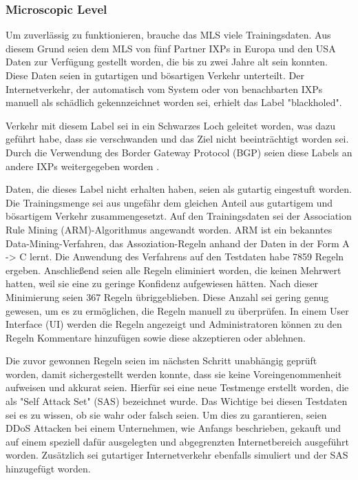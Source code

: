 \documentclass[sigplan,screen]{acmart}
\begin{document}
\subsubsection{Microscopic Level}
Um zuverlässig zu funktionieren, brauche das MLS viele Trainingsdaten. Aus diesem Grund seien dem MLS von fünf Partner IXPs in Europa und den USA Daten zur Verfügung gestellt worden, die bis zu zwei Jahre alt sein konnten. 
Diese Daten seien in gutartigen und bösartigen Verkehr unterteilt. Der Internetverkehr, der automatisch vom System oder von benachbarten IXPs manuell als schädlich gekennzeichnet worden sei, erhielt das Label "blackholed". 

Verkehr mit diesem Label sei in ein Schwarzes Loch geleitet worden, was dazu geführt habe, dass sie verschwanden und das Ziel nicht beeinträchtigt worden sei. 
Durch die Verwendung des Border Gateway Protocol (BGP) seien diese Labels an andere IXPs weitergegeben worden \cite{blackhole01}.

Daten, die dieses Label nicht erhalten haben, seien als gutartig eingestuft worden. Die Trainingsmenge sei aus ungefähr dem gleichen Anteil aus gutartigem und bösartigem Verkehr zusammengesetzt.
Auf den Trainingsdaten sei der Association Rule Mining (ARM)-Algorithmus angewandt worden. ARM ist ein bekanntes Data-Mining-Verfahren, das Assoziation-Regeln anhand der Daten in der Form A -> C lernt. Die Anwendung des Verfahrens auf den Testdaten habe 7859 Regeln ergeben. Anschließend seien alle Regeln eliminiert worden, die keinen Mehrwert hatten, weil sie eine zu geringe Konfidenz aufgewiesen hätten. Nach dieser Minimierung seien 367 Regeln übriggeblieben. Diese Anzahl sei gering genug gewesen, um es zu ermöglichen, die Regeln manuell zu überprüfen. In einem User Interface (UI) werden die Regeln angezeigt und Administratoren können zu den Regeln Kommentare hinzufügen sowie diese akzeptieren oder ablehnen.

Die zuvor gewonnen Regeln seien im nächsten Schritt unabhängig geprüft worden, damit sichergestellt werden konnte, dass sie keine Voreingenommenheit aufweisen und akkurat seien. Hierfür sei eine neue Testmenge erstellt worden, die als "Self Attack Set" (SAS) bezeichnet wurde. Das Wichtige bei diesen Testdaten sei es zu wissen, ob sie wahr oder falsch seien. Um dies zu garantieren, seien DDoS Attacken bei einem Unternehmen, wie Anfangs beschrieben, gekauft und auf einem speziell dafür ausgelegten und abgegrenzten Internetbereich ausgeführt worden. Zusätzlich sei gutartiger Internetverkehr ebenfalls simuliert und der SAS hinzugefügt worden.
\end{document}
